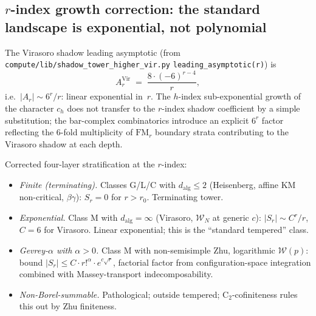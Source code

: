 \documentclass[11pt]{article}
\newcommand{\cW}{\mathcal{W}}
\begin{document}
\subsection{$r$-index growth correction: the standard landscape is
exponential, not polynomial}
\label{subsec:r-index-correction-2026-04-17}

The Virasoro shadow leading asymptotic (from
\verb|compute/lib/shadow_tower_higher_vir.py|
\verb|leading_asymptotic(r)|) is
\[
  A_r^{\mathrm{Vir}} \;=\; \frac{8 \cdot (-6)^{r-4}}{r},
\]
i.e.\ $|A_r| \sim 6^r/r$: linear exponential in~$r$. The
${h}$-index sub-exponential growth of the character $c_h$ does
not transfer to the $r$-index shadow coefficient by a simple
substitution; the bar-complex combinatorics introduce an explicit
$6^r$ factor reflecting the $6$-fold multiplicity of
$\mathrm{FM}_r$ boundary strata contributing to the Virasoro
shadow at each depth.

Corrected four-layer stratification at the $r$-index:
\begin{itemize}
  \item \emph{Finite (terminating).} Classes G/L/C with
        $d_{\mathrm{alg}} \le 2$ (Heisenberg, affine KM non-critical,
        $\beta\gamma$): $S_r = 0$ for $r > r_0$. Terminating tower.
  \item \emph{Exponential.} Class M with $d_{\mathrm{alg}} = \infty$
        (Virasoro, $\cW_N$ at generic $c$): $|S_r| \sim C^r/r$,
        $C = 6$ for Virasoro. Linear exponential; this is the
        ``standard tempered'' class.
  \item \emph{Gevrey-$\alpha$ with $\alpha > 0$.} Class M with
        non-semisimple Zhu, logarithmic $\cW(p)$: bound
        $|S_r| \le C \cdot r!^\alpha \cdot e^{c\sqrt r}$, factorial
        factor from configuration-space integration combined with
        Massey-transport indecomposability.
  \item \emph{Non-Borel-summable.} Pathological; outside tempered;
        C$_2$-cofiniteness rules this out by Zhu finiteness.
\end{itemize}
\end{document}
